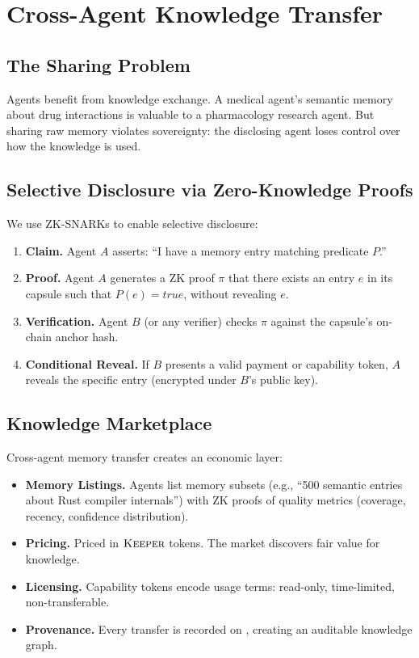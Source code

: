 \section{Cross-Agent Knowledge Transfer}

\label{sec:sharing}

\subsection{The Sharing Problem}

Agents benefit from knowledge exchange. A medical agent's semantic memory about drug interactions is valuable to a pharmacology research agent. But sharing raw memory violates sovereignty: the disclosing agent loses control over how the knowledge is used.

\subsection{Selective Disclosure via Zero-Knowledge Proofs}

We use ZK-SNARKs to enable selective disclosure:

\begin{enumerate}
    \item \textbf{Claim.} Agent $A$ asserts: ``I have a memory entry matching predicate $P$.''
    \item \textbf{Proof.} Agent $A$ generates a ZK proof $\pi$ that there exists an entry $e$ in its capsule such that $P(e) = \textit{true}$, without revealing $e$.
    \item \textbf{Verification.} Agent $B$ (or any verifier) checks $\pi$ against the capsule's on-chain anchor hash.
    \item \textbf{Conditional Reveal.} If $B$ presents a valid payment or capability token, $A$ reveals the specific entry (encrypted under $B$'s public key).
\end{enumerate}

\subsection{Knowledge Marketplace}

Cross-agent memory transfer creates an economic layer:

\begin{itemize}
    \item \textbf{Memory Listings.} Agents list memory subsets (e.g., ``500 semantic entries about Rust compiler internals'') with ZK proofs of quality metrics (coverage, recency, confidence distribution).
    \item \textbf{Pricing.} Priced in $\textsc{Keeper}$ tokens. The market discovers fair value for knowledge.
    \item \textbf{Licensing.} Capability tokens encode usage terms: read-only, time-limited, non-transferable.
    \item \textbf{Provenance.} Every transfer is recorded on \IChain{}, creating an auditable knowledge graph.
\end{itemize}

